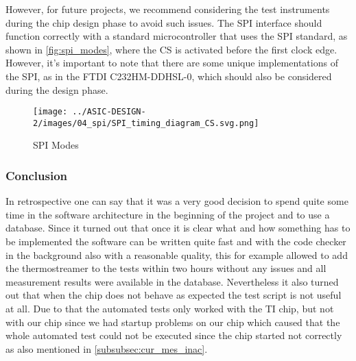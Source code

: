 However, for future projects, we recommend considering the test instruments during the chip design phase to avoid such issues. The SPI interface should function correctly with a standard microcontroller that uses the SPI standard, as shown in \autoref{fig:spi_modes}, where the CS is activated before the first clock edge. However, it's important to note that there are some unique implementations of the SPI, as in the FTDI C232HM-DDHSL-0, which should also be considered during the design phase.

\begin{figure}[h]
    \centering
    \texttt{[image: ../ASIC-DESIGN-2/images/04\_spi/SPI\_timing\_diagram\_CS.svg.png]}
    \caption{SPI Modes \cite{Wikipedia:SPI}}
    \label{fig:spi_modes}
\end{figure}
\subsubsection{Conclusion}
In retrospective one can say that it was a very good decision to spend quite some time in the software architecture in the beginning of the project and to use a database. Since it turned out that once it is clear what and how something has to be implemented the software can be written quite fast and with the code checker in the background also with a reasonable quality, this for example allowed to add the thermostreamer to the tests within two hours without any issues and all measurement results were available in the database. Nevertheless it also turned out that when the chip does not behave as expected the test script is not useful at all. Due to that the automated tests only worked with the TI chip, but not with our chip since we had startup problems on our chip which caused that the whole automated test could not be executed since the chip started not correctly as also mentioned in 
\autoref{subsubsec:cur_mes_inac}.


